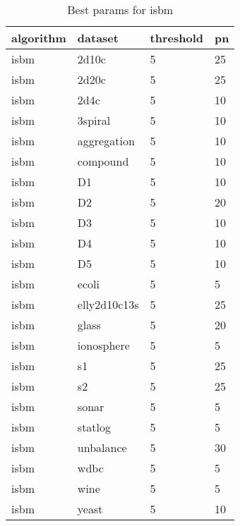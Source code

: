 \begin{table}[H]
\centering
\caption{Best params for isbm}
\label{tab:params:isbm}
\begin{tabular}{|l|l|l|l|}
\hline
algorithm & dataset & threshold & pn \\
\hline
isbm & 2d10c & 5 & 25 \\
\hline
isbm & 2d20c & 5 & 25 \\
\hline
isbm & 2d4c & 5 & 10 \\
\hline
isbm & 3spiral & 5 & 10 \\
\hline
isbm & aggregation & 5 & 10 \\
\hline
isbm & compound & 5 & 10 \\
\hline
isbm & D1 & 5 & 10 \\
\hline
isbm & D2 & 5 & 20 \\
\hline
isbm & D3 & 5 & 10 \\
\hline
isbm & D4 & 5 & 10 \\
\hline
isbm & D5 & 5 & 10 \\
\hline
isbm & ecoli & 5 & 5 \\
\hline
isbm & elly2d10c13s & 5 & 25 \\
\hline
isbm & glass & 5 & 20 \\
\hline
isbm & ionosphere & 5 & 5 \\
\hline
isbm & s1 & 5 & 25 \\
\hline
isbm & s2 & 5 & 25 \\
\hline
isbm & sonar & 5 & 5 \\
\hline
isbm & statlog & 5 & 5 \\
\hline
isbm & unbalance & 5 & 30 \\
\hline
isbm & wdbc & 5 & 5 \\
\hline
isbm & wine & 5 & 5 \\
\hline
isbm & yeast & 5 & 10 \\
\hline
\end{tabular}
\end{table}
